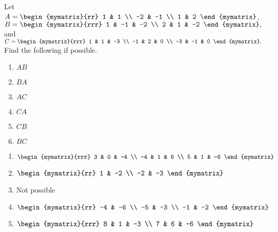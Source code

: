 \begin{enumialphparenastyle}
\begin{ex} Let $A=\begin{mymatrix}{rr}
1 & 1 \\
-2 & -1 \\
1 & 2
\end{mymatrix} $, $B=\begin{mymatrix}{rrr}
1 & -1 & -2 \\
2 & 1 & -2
\end{mymatrix} ,$ and $C=\begin{mymatrix}{rrr}
1 & 1 & -3 \\
-1 & 2 & 0 \\
-3 & -1 & 0
\end{mymatrix} .$ Find the following if possible. 

\begin{enumerate}
\item $AB$

\item $BA$

\item $AC$

\item $CA$

\item $CB$

\item $BC$
\end{enumerate}

\begin{sol}
\begin{enumerate}
\item $\begin{mymatrix}{rrr}
3 & 0 & -4 \\
-4 & 1 & 6 \\
5 & 1 & -6
\end{mymatrix} $
\item $\begin{mymatrix}{rr}
1 & -2 \\
-2 & -3
\end{mymatrix} $
\item Not possible
\item $\begin{mymatrix}{rr}
-4 & -6 \\
-5 & -3 \\
-1 & -2
\end{mymatrix} $
\item $\begin{mymatrix}{rrr}
8 & 1 & -3 \\
7 & 6 & -6
\end{mymatrix} $
\end{enumerate}
\end{sol}
\end{ex}


\end{enumialphparenastyle}
